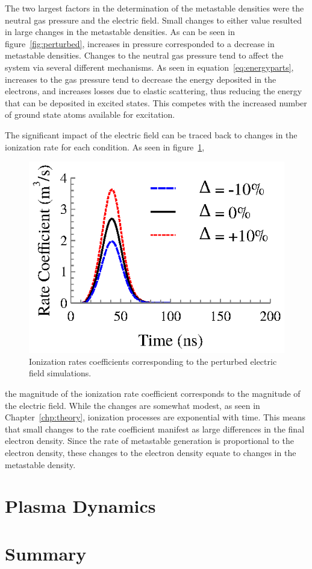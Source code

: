 The two largest factors in the determination of the metastable densities were
the neutral gas pressure and the electric field. Small changes to either value
resulted in large changes in the metastable densities. As can be seen in
figure~\ref{fig:perturbed}, increases in pressure corresponded to a decrease in
metastable densities. Changes to the neutral gas pressure tend to affect the
system via several different mechanisms. As seen in
equation~\ref{eq:energyparts}, increases to the gas pressure tend to decrease
the energy deposited in the electrons, and increases losses due to elastic
scattering, thus reducing the energy that can be deposited in excited states.
This competes with the increased number of ground state atoms available for
excitation.

The significant impact of the electric field can be traced back to changes in
the ionization rate for each condition. As seen in figure~\ref{fig:ionrates},
\begin{figure}
  \centering
  \includegraphics{./chapters/modeling/figures/ionrates.eps}
  \caption{Ionization rates coefficients corresponding to the perturbed electric
  field simulations.}
  \label{fig:ionrates}
\end{figure}
the magnitude of the ionization rate coefficient corresponds to the magnitude of
the electric field. While the changes are somewhat modest, as seen in
Chapter~\ref{chp:theory}, ionization processes are exponential with time. This
means that small changes to the rate coefficient manifest as large differences
in the final electron density. Since the rate of metastable generation is
proportional to the electron density, these changes to the electron density
equate to changes in the metastable density.

\section{Plasma Dynamics}



\section{Summary}


